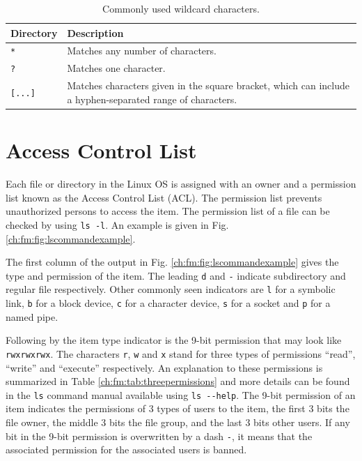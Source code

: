 \begin{table}
  \centering \caption{Commonly used wildcard characters.}\label{ch:fm:tab:metacharacters}
  \begin{tabularx}{\textwidth}{lX}
    \hline
    Directory & Description \\ \hline
    \verb|*| & Matches any number of characters. \\ 
    \verb|?| & Matches one character. \\ 
    \verb|[...]| & Matches characters given in the square bracket, which can include a hyphen-separated range of characters. \\
    \hline
  \end{tabularx}
\end{table}

\section{Access Control List} \label{ch:fm:sec:accesscontrollist}

Each file or directory in the Linux OS is assigned with an owner and a permission list known as the Access Control List (ACL). The permission list prevents unauthorized persons to access the item. The permission list of a file can be checked by using \verb|ls -l|. An example is given in Fig. \ref{ch:fm:fig:lscommandexample}.

The first column of the output in Fig. \ref{ch:fm:fig:lscommandexample} gives the type and permission of the item. The leading \verb|d| and \verb|-| indicate subdirectory and regular file respectively. Other commonly seen indicators are \verb|l| for a symbolic link, \verb|b| for a block device, \verb|c| for a character device, \verb|s| for a socket and \verb|p| for a named pipe.

Following by the item type indicator is the 9-bit permission that may look like \verb|rwxrwxrwx|. The characters \verb|r|, \verb|w| and \verb|x| stand for three types of permissions ``read'', ``write'' and ``execute'' respectively. An explanation to these permissions is summarized in Table \ref{ch:fm:tab:threepermissions} and more details can be found in the \verb|ls| command manual available using \verb|ls --help|. The 9-bit permission of an item indicates the permissions of 3 types of users to the item, the first 3 bits the file owner, the middle 3 bits the file group, and the last 3 bits other users. If any bit in the 9-bit permission is overwritten by a dash \verb|-|, it means that the associated permission for the associated users is banned.

